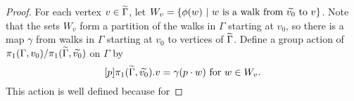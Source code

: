 \begin{proof}
  For each vertex $v \in \widetilde{\Gamma}$, let $W_v = \lbrace \phi(w) \ \vert \ w \text{ is a walk from } \widetilde{v_0} \text{ to } v \rbrace$. Note that the sets $W_v$ form a partition of the walks in $\Gamma$ starting at $v_0$, so there is a map $\gamma$ from walks in $\Gamma$ starting at $v_0$ to vertices of $\widetilde{\Gamma}$. Define a group action of $\pi_1(\Gamma, v_0) / \pi_1(\widetilde{\Gamma}, \widetilde{v_0})$ on $\Gamma$ by
  $$
    [p]\pi_1(\widetilde{\Gamma}, \widetilde{v_0}) . v = \gamma(p \cdot w) \text{ for } w \in W_v.
  $$
  This action is well defined because for 

\end{proof}
